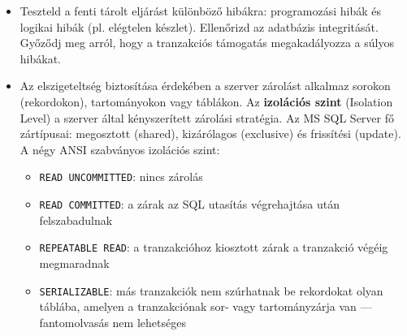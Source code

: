 \documentclass[
  magyar,
]{article}
\providecommand{\tightlist}{%
  \setlength{\itemsep}{0pt}\setlength{\parskip}{0pt}}
\begin{document}
\begin{itemize}
\item
  Teszteld a fenti tárolt eljárást különböző hibákra: programozási hibák
  és logikai hibák (pl. elégtelen készlet). Ellenőrizd az adatbázis
  integritását. Győződj meg arról, hogy a tranzakciós támogatás
  megakadályozza a súlyos hibákat.
\item
  Az elszigeteltség biztosítása érdekében a szerver zárolást alkalmaz
  sorokon (rekordokon), tartományokon vagy táblákon. Az
  \textbf{izolációs szint} (Isolation Level) a szerver által
  kényszerített zárolási stratégia. Az MS SQL Server fő zártípusai:
  megosztott (shared), kizárólagos (exclusive) és frissítési (update). A
  négy ANSI szabványos izolációs szint:

  \begin{itemize}
  \tightlist
  \item
    \texttt{READ\ UNCOMMITTED}: nincs zárolás
  \item
    \texttt{READ\ COMMITTED}: a zárak az SQL utasítás végrehajtása után
    felszabadulnak
  \item
    \texttt{REPEATABLE\ READ}: a tranzakcióhoz kiosztott zárak a
    tranzakció végéig megmaradnak
  \item
    \texttt{SERIALIZABLE}: más tranzakciók nem szúrhatnak be rekordokat
    olyan táblába, amelyen a tranzakciónak sor- vagy tartományzárja van
    --- fantomolvasás nem lehetséges
  \end{itemize}
\end{itemize}
\end{document}
